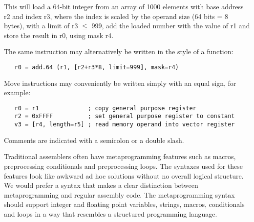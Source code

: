 \documentclass[forwardcom.tex]{subfiles}
\begin{document}
This will load a 64-bit integer from an array of 1000 elements with base address r2 and index r3, where the index is scaled by the operand size (64 bits = 8 bytes), with a limit of r3 $\leq$ 999, add the loaded number with the value of r1 and store the result in r0, using mask r4.
\vspace{2mm}

The same instruction may alternatively be written in the style of a function: 
\begin{lstlisting}
   r0 = add.64 (r1, [r2+r3*8, limit=999], mask=r4)
\end{lstlisting}

Move instructions may conveniently be written simply with an equal sign, for example:
\begin{lstlisting}
   r0 = r1              ; copy general purpose register
   r2 = 0xFFFF          ; set general purpose register to constant
   v3 = [r4, length=r5] ; read memory operand into vector register
\end{lstlisting}

Comments are indicated with a semicolon or a double slash.
\vspace{2mm}

Traditional assemblers often have metaprogramming features such as macros, preprocessing conditionals and preprocessing loops. The syntaxes used for these features look like awkward ad hoc solutions without no overall logical structure. We would prefer a syntax that makes a clear distinction between metaprogramming and regular assembly code. The metaprogramming syntax should support integer and floating point variables, strings, macros, conditionals and loops in a way that resembles a structured programming language. 
\vspace{2mm}
\end{document}
